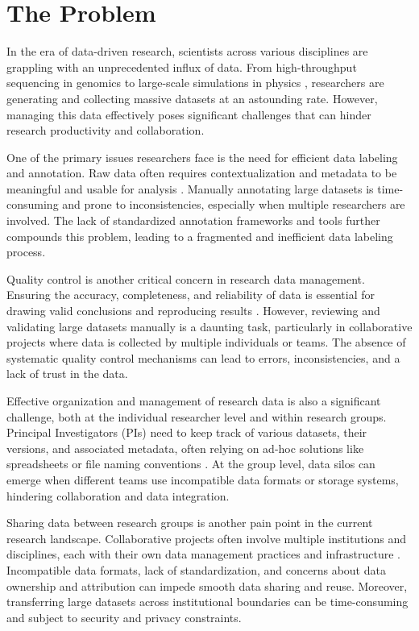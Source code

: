 \documentclass[conference]{IEEEtran}
\begin{document}
\section{The Problem}
In the era of data-driven research, scientists across various disciplines are grappling with an unprecedented influx of data. From high-throughput sequencing in genomics \cite{stephens2015big} to large-scale simulations in physics \cite{vogelsberger2014introducing}, researchers are generating and collecting massive datasets at an astounding rate. However, managing this data effectively poses significant challenges that can hinder research productivity and collaboration.

One of the primary issues researchers face is the need for efficient data labeling and annotation. Raw data often requires contextualization and metadata to be meaningful and usable for analysis \cite{wilkinson2016fair}. Manually annotating large datasets is time-consuming and prone to inconsistencies, especially when multiple researchers are involved. The lack of standardized annotation frameworks and tools further compounds this problem, leading to a fragmented and inefficient data labeling process.

Quality control is another critical concern in research data management. Ensuring the accuracy, completeness, and reliability of data is essential for drawing valid conclusions and reproducing results \cite{eisner2018data}. However, reviewing and validating large datasets manually is a daunting task, particularly in collaborative projects where data is collected by multiple individuals or teams. The absence of systematic quality control mechanisms can lead to errors, inconsistencies, and a lack of trust in the data.

Effective organization and management of research data is also a significant challenge, both at the individual researcher level and within research groups. Principal Investigators (PIs) need to keep track of various datasets, their versions, and associated metadata, often relying on ad-hoc solutions like spreadsheets or file naming conventions \cite{kowalczyk2018data}. At the group level, data silos can emerge when different teams use incompatible data formats or storage systems, hindering collaboration and data integration.

Sharing data between research groups is another pain point in the current research landscape. Collaborative projects often involve multiple institutions and disciplines, each with their own data management practices and infrastructure \cite{tenopir2011data}. Incompatible data formats, lack of standardization, and concerns about data ownership and attribution can impede smooth data sharing and reuse. Moreover, transferring large datasets across institutional boundaries can be time-consuming and subject to security and privacy constraints.
\end{document}
